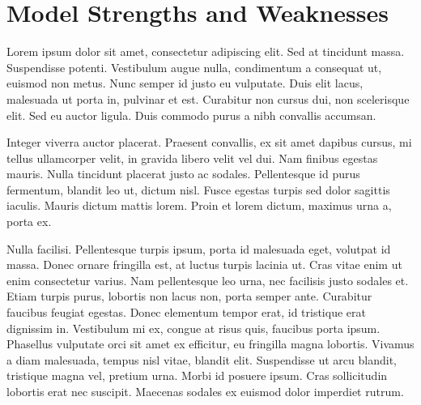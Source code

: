 \section{Model Strengths and Weaknesses}
Lorem ipsum dolor sit amet, consectetur adipiscing elit. Sed at tincidunt massa. Suspendisse potenti. Vestibulum augue nulla, condimentum a consequat ut, euismod non metus. Nunc semper id justo eu vulputate. Duis elit lacus, malesuada ut porta in, pulvinar et est. Curabitur non cursus dui, non scelerisque elit. Sed eu auctor ligula. Duis commodo purus a nibh convallis accumsan.

Integer viverra auctor placerat. Praesent convallis, ex sit amet dapibus cursus, mi tellus ullamcorper velit, in gravida libero velit vel dui. Nam finibus egestas mauris. Nulla tincidunt placerat justo ac sodales. Pellentesque id purus fermentum, blandit leo ut, dictum nisl. Fusce egestas turpis sed dolor sagittis iaculis. Mauris dictum mattis lorem. Proin et lorem dictum, maximus urna a, porta ex.

Nulla facilisi. Pellentesque turpis ipsum, porta id malesuada eget, volutpat id massa. Donec ornare fringilla est, at luctus turpis lacinia ut. Cras vitae enim ut enim consectetur varius. Nam pellentesque leo urna, nec facilisis justo sodales et. Etiam turpis purus, lobortis non lacus non, porta semper ante. Curabitur faucibus feugiat egestas. Donec elementum tempor erat, id tristique erat dignissim in. Vestibulum mi ex, congue at risus quis, faucibus porta ipsum. Phasellus vulputate orci sit amet ex efficitur, eu fringilla magna lobortis. Vivamus a diam malesuada, tempus nisl vitae, blandit elit. Suspendisse ut arcu blandit, tristique magna vel, pretium urna. Morbi id posuere ipsum. Cras sollicitudin lobortis erat nec suscipit. Maecenas sodales ex euismod dolor imperdiet rutrum.


